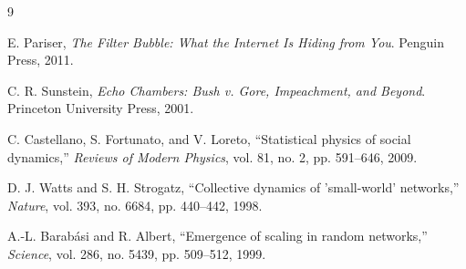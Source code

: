 \documentclass[11pt,a4paper]{article}
\begin{document}
\begin{thebibliography}{9}

E. Pariser,
\textit{The Filter Bubble: What the Internet Is Hiding from You}.
Penguin Press, 2011.

C. R. Sunstein,
\textit{Echo Chambers: Bush v. Gore, Impeachment, and Beyond}.
Princeton University Press, 2001.

C. Castellano, S. Fortunato, and V. Loreto,
``Statistical physics of social dynamics,''
\textit{Reviews of Modern Physics}, vol. 81, no. 2, pp. 591--646, 2009.

D. J. Watts and S. H. Strogatz,
``Collective dynamics of 'small-world' networks,''
\textit{Nature}, vol. 393, no. 6684, pp. 440--442, 1998.

A.-L. Barabási and R. Albert,
``Emergence of scaling in random networks,''
\textit{Science}, vol. 286, no. 5439, pp. 509--512, 1999.

\end{thebibliography}
\end{document}
